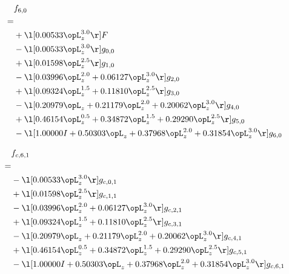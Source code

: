 \begin{alignat}{2} 
\label{eq:f_60_0} 
& f_{6,0} \nonumber \\ 
 = \\ 
& + \l[  0.00533 \opL_z^{3.0}  \r] F \nonumber \\ 
& - \l[  0.00533 \opL_z^{3.0}  \r] g_{0,0} \nonumber \\ 
& + \l[  0.01598 \opL_z^{2.5}  \r] g_{1,0} \nonumber \\ 
& - \l[  0.03996 \opL_z^{2.0} +  0.06127 \opL_z^{3.0}  \r] g_{2,0} \nonumber \\ 
& + \l[  0.09324 \opL_z^{1.5} +  0.11810 \opL_z^{2.5}  \r] g_{3,0} \nonumber \\ 
& - \l[  0.20979 \opL_z +  0.21179 \opL_z^{2.0} +  0.20062 \opL_z^{3.0}  \r] g_{4,0} \nonumber \\ 
& + \l[  0.46154 \opL_z^{0.5} +  0.34872 \opL_z^{1.5} +  0.29290 \opL_z^{2.5}  \r] g_{5,0} \nonumber \\ 
& - \l[  1.00000 I +  0.50303 \opL_z +  0.37968 \opL_z^{2.0} +  0.31854 \opL_z^{3.0}  \r] g_{6,0} \nonumber \\ 
\end{alignat} 


\begin{alignat}{2} 
\label{eq:f_61_0} 
& f_{c,6,1} \nonumber \\ 
 = \\ 
& - \l[  0.00533 \opL_z^{3.0}  \r] g_{c,0,1} \nonumber \\ 
& + \l[  0.01598 \opL_z^{2.5}  \r] g_{c,1,1} \nonumber \\ 
& - \l[  0.03996 \opL_z^{2.0} +  0.06127 \opL_z^{3.0}  \r] g_{c,2,1} \nonumber \\ 
& + \l[  0.09324 \opL_z^{1.5} +  0.11810 \opL_z^{2.5}  \r] g_{c,3,1} \nonumber \\ 
& - \l[  0.20979 \opL_z +  0.21179 \opL_z^{2.0} +  0.20062 \opL_z^{3.0}  \r] g_{c,4,1} \nonumber \\ 
& + \l[  0.46154 \opL_z^{0.5} +  0.34872 \opL_z^{1.5} +  0.29290 \opL_z^{2.5}  \r] g_{c,5,1} \nonumber \\ 
& - \l[  1.00000 I +  0.50303 \opL_z +  0.37968 \opL_z^{2.0} +  0.31854 \opL_z^{3.0}  \r] g_{c,6,1} \nonumber \\ 
\end{alignat} 


